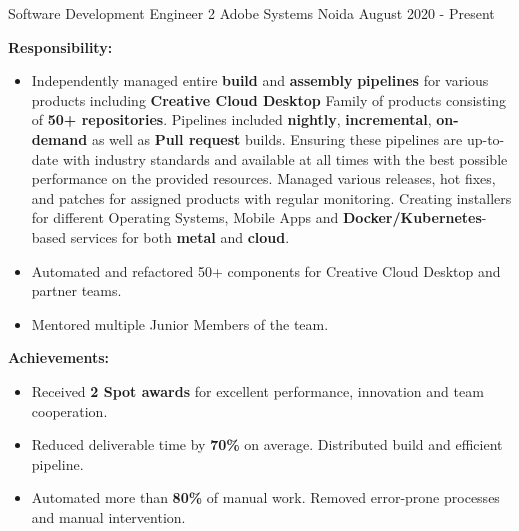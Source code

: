 

\begin{cventries}
\vspace{-1mm}

\cventry\textbf{}
    {Software Development Engineer 2} %
    {Adobe Systems} %
    {Noida} %
    {August 2020 - Present} %
    {
        \vspace{-4mm}
        \item \textbf{Responsibility:} 
        \begin{itemize}
            \item Independently managed entire \textbf{build} and \textbf{assembly} \textbf{pipelines} for various products including \textbf{Creative Cloud Desktop} Family of products consisting of \textbf{50+ repositories}. Pipelines included \textbf{nightly}, \textbf{incremental}, \textbf{on-demand} as well as \textbf{Pull request} builds. Ensuring these pipelines are up-to-date with industry standards and available at all times with the best possible performance on the provided resources. Managed various releases, hot fixes, and patches for assigned products with regular monitoring. Creating installers for different Operating Systems, Mobile Apps and \textbf{Docker/Kubernetes}-based services for both \textbf{metal} and \textbf{cloud}.
            \item Automated and refactored 50+ components for Creative Cloud Desktop and partner teams.
            \item Mentored multiple Junior Members of the team.
        \end{itemize}
        \item \textbf{Achievements:}
        \begin{itemize}
            \item Received \textbf{2 Spot awards} for excellent performance, innovation and team cooperation.
            \item Reduced deliverable time by \textbf{70\%} on average. Distributed build and efficient pipeline.
            \item Automated more than \textbf{80\%} of manual work. Removed error-prone processes and manual intervention.

\end{itemize}}
\end{cventries}
